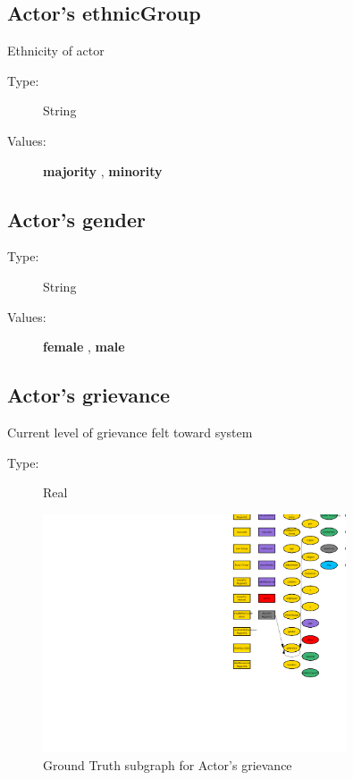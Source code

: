 \documentclass{article}%
\begin{document}
%
\subsection{Actor's ethnicGroup}%
\label{subsec:Actor's ethnicGroup}%
Ethnicity of actor%
\begin{description}%
\item[Type:]%
String%
\item[Values:]%
\textbf{majority}%
, %
\textbf{minority}%
\end{description}

%
\subsection{Actor's gender}%
\label{subsec:Actor's gender}%
\begin{description}%
\item[Type:]%
String%
\item[Values:]%
\textbf{female}%
, %
\textbf{male}%
\end{description}

%
\subsection{Actor's grievance}%
\label{subsec:Actor's grievance}%
Current level of grievance felt toward system%
\begin{description}%
\item[Type:]%
Real%
\end{description}%


\begin{figure}[ht]%
\centering%
\includegraphics[width=0.8\textwidth]{images/grievanceOfActor.png}%
\caption{Ground Truth subgraph for Actor's grievance}%
\end{figure}
\end{document}
